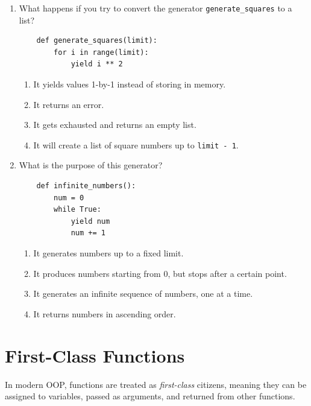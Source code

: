 \documentclass[oneside,11pt,dvipsnames]{book}
\newcommand{\code}[1]{\texttt{#1}}
\begin{document}
\begin{enumerate}

\item What happens if you try to convert the generator \texttt{generate\_squares} to a list?

\begin{lstlisting}
    def generate_squares(limit):
        for i in range(limit):
            yield i ** 2
    \end{lstlisting}

\begin{enumerate}
    \item It yields values 1-by-1 instead of storing in memory.
    \item It returns an error.
    \item It gets exhausted and returns an empty list.
    \item It will create a list of square numbers up to \code{limit - 1}.
\end{enumerate}



\item What is the purpose of this generator?
\begin{lstlisting}
    def infinite_numbers():
        num = 0
        while True:
            yield num
            num += 1
    \end{lstlisting}
\begin{enumerate}
    \item It generates numbers up to a fixed limit.
    \item It produces numbers starting from 0, but stops after a certain point.
    \item It generates an infinite sequence of numbers, one at a time.
    \item It returns numbers in ascending order.
\end{enumerate}

\end{enumerate}



\chapter{First-Class Functions}\label{chap:first-class-functions}

In modern OOP, functions are treated as \emph{first-class} citizens, meaning they can be assigned to variables, passed as arguments, and returned from other functions.
\end{document}
